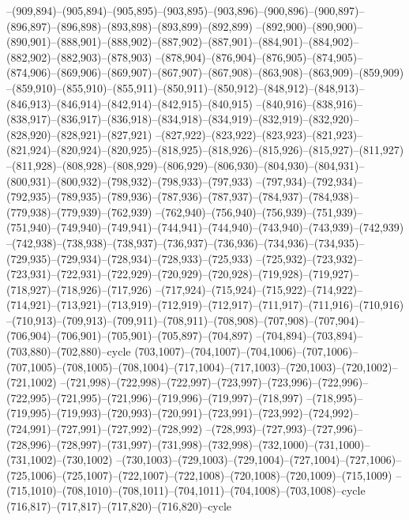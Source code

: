 --(909,894)--(905,894)--(905,895)--(903,895)--(903,896)--(900,896)--(900,897)--(896,897)--(896,898)--(893,898)--(893,899)--(892,899)
--(892,900)--(890,900)--(890,901)--(888,901)--(888,902)--(887,902)--(887,901)--(884,901)--(884,902)--(882,902)--(882,903)--(878,903)
--(878,904)--(876,904)--(876,905)--(874,905)--(874,906)--(869,906)--(869,907)--(867,907)--(867,908)--(863,908)--(863,909)--(859,909)
--(859,910)--(855,910)--(855,911)--(850,911)--(850,912)--(848,912)--(848,913)--(846,913)--(846,914)--(842,914)--(842,915)--(840,915)
--(840,916)--(838,916)--(838,917)--(836,917)--(836,918)--(834,918)--(834,919)--(832,919)--(832,920)--(828,920)--(828,921)--(827,921)
--(827,922)--(823,922)--(823,923)--(821,923)--(821,924)--(820,924)--(820,925)--(818,925)--(818,926)--(815,926)--(815,927)--(811,927)
--(811,928)--(808,928)--(808,929)--(806,929)--(806,930)--(804,930)--(804,931)--(800,931)--(800,932)--(798,932)--(798,933)--(797,933)
--(797,934)--(792,934)--(792,935)--(789,935)--(789,936)--(787,936)--(787,937)--(784,937)--(784,938)--(779,938)--(779,939)--(762,939)
--(762,940)--(756,940)--(756,939)--(751,939)--(751,940)--(749,940)--(749,941)--(744,941)--(744,940)--(743,940)--(743,939)--(742,939)
--(742,938)--(738,938)--(738,937)--(736,937)--(736,936)--(734,936)--(734,935)--(729,935)--(729,934)--(728,934)--(728,933)--(725,933)
--(725,932)--(723,932)--(723,931)--(722,931)--(722,929)--(720,929)--(720,928)--(719,928)--(719,927)--(718,927)--(718,926)--(717,926)
--(717,924)--(715,924)--(715,922)--(714,922)--(714,921)--(713,921)--(713,919)--(712,919)--(712,917)--(711,917)--(711,916)--(710,916)
--(710,913)--(709,913)--(709,911)--(708,911)--(708,908)--(707,908)--(707,904)--(706,904)--(706,901)--(705,901)--(705,897)--(704,897)
--(704,894)--(703,894)--(703,880)--(702,880)--cycle
(703,1007)--(704,1007)--(704,1006)--(707,1006)--(707,1005)--(708,1005)--(708,1004)--(717,1004)--(717,1003)--(720,1003)--(720,1002)--(721,1002)
--(721,998)--(722,998)--(722,997)--(723,997)--(723,996)--(722,996)--(722,995)--(721,995)--(721,996)--(719,996)--(719,997)--(718,997)
--(718,995)--(719,995)--(719,993)--(720,993)--(720,991)--(723,991)--(723,992)--(724,992)--(724,991)--(727,991)--(727,992)--(728,992)
--(728,993)--(727,993)--(727,996)--(728,996)--(728,997)--(731,997)--(731,998)--(732,998)--(732,1000)--(731,1000)--(731,1002)--(730,1002)
--(730,1003)--(729,1003)--(729,1004)--(727,1004)--(727,1006)--(725,1006)--(725,1007)--(722,1007)--(722,1008)--(720,1008)--(720,1009)--(715,1009)
--(715,1010)--(708,1010)--(708,1011)--(704,1011)--(704,1008)--(703,1008)--cycle
(716,817)--(717,817)--(717,820)--(716,820)--cycle
